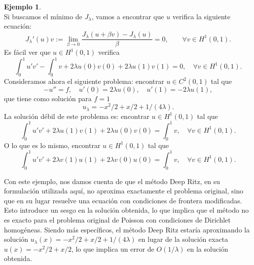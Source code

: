 \documentclass[a4paper,11pt,spanish, twoside, leqno]{tfg-uam}
\theoremstyle{definition}
\newtheorem{exmp}[teor]{Ejemplo}
\begin{document}
\begin{mdframed}
\begin{exmp}
\begin{equation*}
        \end{equation*}
        Si buscamos el mínimo de $ J_\lambda $, vamos a encontrar que $u$ verifica la siguiente ecuación:
        \begin{equation*}
        J_\lambda'(u)v := \lim_{\beta \to 0} \frac{J_\lambda(u + \beta v) - J_\lambda(u)}{\beta} = 0, \qquad \forall v \in H^1(0,1).
        \end{equation*}
        Es fácil ver que $u \in H^1(0,1)$ verifica
        \begin{equation*}
        \int_0^1 u'v' - \int_0^1 v + 2\lambda u(0)v(0) + 2\lambda u(1)v(1) = 0, \quad \forall v \in H^1(0,1).
        \end{equation*}
        Consideramos ahora el siguiente problema: encontrar $u \in C^2(0,1)$ tal que 
        \begin{equation*}
        -u'' = f, \quad u'(0) = 2\lambda u(0), \quad u'(1) = -2\lambda u(1),
        \end{equation*}
        que tiene como solución para $f = 1$
        \begin{equation*}
        u_\lambda = -x^2/2 + x/2 + 1/(4\lambda).
        \end{equation*}
        La solución débil de este problema es: encontrar $u \in H^1(0,1)$ tal que 
        \begin{equation*}
        \int_0^1 u'v' + 2\lambda u(1)v(1) + 2\lambda u(0)v(0) = \int_0^1 v, \quad \forall v \in H^1(0,1).
        \end{equation*}
        O lo que es lo mismo, encontrar $u \in H^1(0,1)$ tal que 
        \begin{equation*}
        \int_0^1 u'v' + 2\lambda v(1)u(1) + 2\lambda v(0)u(0) = \int_0^1 v, \quad \forall v \in H^1(0,1).
        \end{equation*}
    \end{exmp}
\end{mdframed}
    
Con este ejemplo, nos damos cuenta de que el método Deep Ritz, en su formulación utilizada aquí, no aproxima exactamente el problema original, sino que en su lugar resuelve una ecuación con condiciones de frontera modificadas. Esto introduce un sesgo en la solución obtenida, lo que implica que el método no es exacto para el problema original de Poisson con condiciones de Dirichlet homogéneas. Siendo más específicos, el método Deep Ritz estaría aproximando la solución $u_\lambda(x) = -x^2/2 + x/2 + 1/(4\lambda)$ en lugar de la solución exacta $u(x) = -x^2/2 + x/2$, lo que implica un error de $O(1/\lambda)$ en la solución obtenida. 
\end{document}

